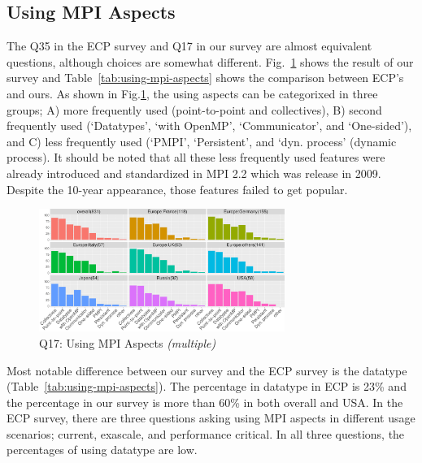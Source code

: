 \documentclass[conference,10pt,letterpaper]{IEEEtran}
\def\myquote#1{`#1'}
\begin{document}
\subsection{Using MPI Aspects}\label{sec:mpi-aspects}

The Q35 in the ECP survey and Q17 in our survey are almost equivalent
questions, although choices are somewhat
different. Fig.~\ref{fig:using-mpi-aspects} shows the result of our 
survey and Table~\ref{tab:using-mpi-aspects} shows the comparison
between ECP's and ours. As shown in Fig.\ref{fig:using-mpi-aspects}, the
using aspects can be categorixed in three groups; A) more frequently
used (point-to-point and collectives), B) second frequently used
(\myquote{Datatypes}, \myquote{with OpenMP}, \myquote{Communicator}, and \myquote{One-sided}), and C) less
frequently used (\myquote{PMPI}, \myquote{Persistent}, and
\myquote{dyn. process} (dynamic process).
It should be noted that all these less frequently used features were
already introduced and standardized in MPI 2.2 which was release in
2009. Despite the 10-year appearance, those features failed to get
popular.  

\begin{figure}[htb]
  \begin{center}
    \includegraphics[width=8cm]{R-scripts/Q17.pdf}
    \caption{Q17: Using MPI Aspects {\it(multiple)}}
    \label{fig:using-mpi-aspects}
  \end{center}
\end{figure}

Most notable difference between our survey and the ECP survey is the
datatype (Table~\ref{tab:using-mpi-aspects}). The percentage in
datatype in ECP is 23\% and the percentage in our survey is more
than 60\% in both overall and USA. In the ECP survey, there are three
questions asking using MPI aspects in different usage scenarios; current,
exascale, and performance critical. In all three questions, the
percentages of using datatype are low.
\end{document}
